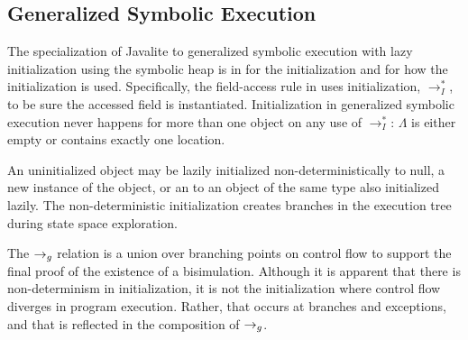 \subsection{Generalized Symbolic Execution}
\label{app:gse}
The specialization of Javalite to generalized symbolic execution with
lazy initialization using the symbolic heap is in
 for the initialization and  for
how the initialization is used. Specifically, the field-access rule in
 uses initialization, $\rightarrow_I^*$, to be sure
the accessed field is instantiated. Initialization in generalized
symbolic execution never happens for more than one object on any use
of $\rightarrow_I^*$: $\Lambda$ is either empty or contains exactly
one location.

An uninitialized object may be lazily initialized
non-deterministically to null, a new instance of the object, or an to
an object of the same type also initialized lazily. The
non-deterministic initialization creates branches in the execution
tree during state space exploration. 

The $\rightarrow_{g}$ relation is a union over branching points on control flow
to support the final proof of the existence of a
bisimulation. Although it is apparent that there is non-determinism in
initialization, it is not the initialization where control flow
diverges in program execution. Rather, that occurs at branches and
exceptions, and that is reflected in the composition of $\rightarrow_{g}$.



